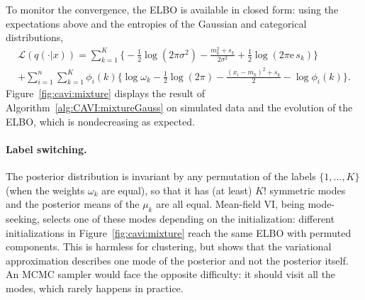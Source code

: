 \documentclass[english,graybox,envcountchap,envcountsame,sectrefs,shortlabels]{svmono}
\theoremstyle{style}
\newcommand{\rme}{\mathrm{e}}
\newcommand{\eqsp}{}
\begin{document}
\begin{algorithm}[H] \label{alg:CAVI:mixtureGauss}
\caption{A version of CAVI algorithm for a Bayesian mixture of Gaussian distributions.}
\end{algorithm}

To monitor the convergence, the ELBO is available in closed form: using the expectations above and the entropies of the Gaussian and categorical distributions,
\begin{multline*}
\mathcal{L}(q(\cdot|x)) = \sum_{k=1}^K\Big\{-\frac12\log(2\pi\sigma^2) - \frac{m_k^2+s_k}{2\sigma^2} + \frac12\log(2\pi\rme\, s_k)\Big\}\\
+ \sum_{i=1}^n\sum_{k=1}^K\phi_i(k)\Big\{\log\omega_k - \frac12\log(2\pi) - \frac{(x_i-m_k)^2+s_k}{2} - \log\phi_i(k)\Big\}\eqsp.
\end{multline*}
Figure~\ref{fig:cavi:mixture} displays the result of Algorithm~\ref{alg:CAVI:mixtureGauss} on simulated data and the evolution of the ELBO, which is nondecreasing as expected.

\paragraph{Label switching.} The posterior distribution is invariant by any permutation of the labels $\{1,\ldots,K\}$ (when the weights $\omega_k$ are equal), so that it has (at least) $K!$ symmetric modes and the posterior means of the $\mu_k$ are all equal. Mean-field VI, being mode-seeking, selects one of these modes depending on the initialization: different initializations in Figure~\ref{fig:cavi:mixture} reach the same ELBO with permuted components. This is harmless for clustering, but shows that the variational approximation describes one mode of the posterior and not the posterior itself. An MCMC sampler would face the opposite difficulty: it should visit all the modes, which rarely happens in practice.
\end{document}
